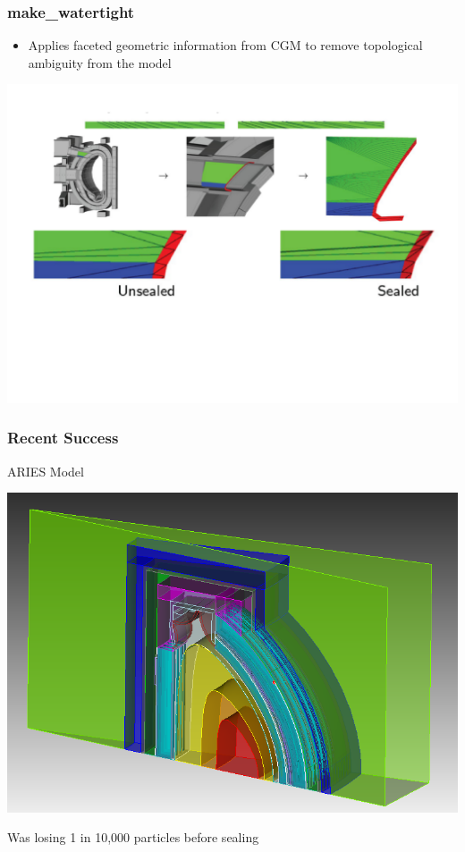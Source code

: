 \documentclass[14pt]{beamer}
\begin{document}
\begin{frame}
\frametitle{make\_watertight}
\begin{itemize}
\item Applies faceted geometric information from CGM to remove topological ambiguity from the model
\end{itemize}
\includegraphics[scale=0.4, trim = 20 50 0 0]{sealing_ex.png}
\end{frame}




\begin{frame}
\frametitle{Recent Success}

ARIES Model
\begin{center}
\includegraphics[scale=0.3]{sic.png}
\end{center}
Was losing 1 in 10,000 particles before sealing
\end{frame}
\end{document}
